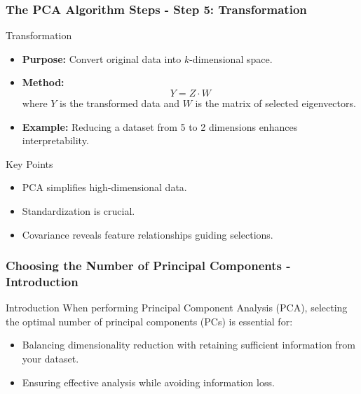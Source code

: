 \documentclass[aspectratio=169]{beamer}
\begin{document}
\begin{frame}[fragile]
    \frametitle{The PCA Algorithm Steps - Step 5: Transformation}
    \begin{block}{Transformation}
        \begin{itemize}
            \item \textbf{Purpose:} Convert original data into \( k \)-dimensional space.
            \item \textbf{Method:}
            \begin{equation}
                Y = Z \cdot W
            \end{equation}
            where \( Y \) is the transformed data and \( W \) is the matrix of selected eigenvectors.
            \item \textbf{Example:} Reducing a dataset from 5 to 2 dimensions enhances interpretability.
        \end{itemize}
    \end{block}

    \begin{block}{Key Points}
        \begin{itemize}
            \item PCA simplifies high-dimensional data.
            \item Standardization is crucial.
            \item Covariance reveals feature relationships guiding selections.
        \end{itemize}
    \end{block}
\end{frame}

\begin{frame}[fragile]
    \frametitle{Choosing the Number of Principal Components - Introduction}
    \begin{block}{Introduction}
        When performing Principal Component Analysis (PCA), selecting the optimal number of principal components (PCs) is essential for:
        \begin{itemize}
            \item Balancing dimensionality reduction with retaining sufficient information from your dataset.
            \item Ensuring effective analysis while avoiding information loss.
        \end{itemize}
    \end{block}
\end{frame}
\end{document}
